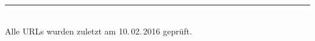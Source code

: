 \documentclass[%
  final,      %
  paper=a4,%
  paper=portrait, %
  pagesize=auto, %
  fontsize=12pt,%
  version=last, %
  toc=noindex,
  toc=bib,
  toc=nolistof,
  listof=left, %
  listof=indented, %
  listof=chaptergapsmall, %
  listof=totoc %
 ]{scrbook}
\begin{document}











%









\noindent\rule{8cm}{0.4pt}\\
Alle URLs wurden zuletzt am 10.\,02.\,2016 geprüft.




\backmatter


\cleardoublepage
{}

\listoffigures
{}
\end{document}
